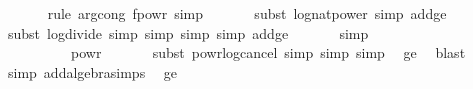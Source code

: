 \begin{isabellebody}
\ \ \ \ \ \isamarkupfalse%
\ {\isacharparenleft}{\kern0pt}rule\ arg{\isacharunderscore}{\kern0pt}cong{}{\isacharbrackleft}{\kern0pt}\ f{\isacharequal}{\kern0pt}{\isachardoublequoteopen}{\isacharparenleft}{\kern0pt}powr{\isacharparenright}{\kern0pt}{\isachardoublequoteclose}{\isacharbrackright}{\kern0pt}{\isacharcomma}{\kern0pt}\ simp{\isacharparenright}{\kern0pt}\isanewline
\ \ \ \ \ \isamarkupfalse%
\ {\isacharparenleft}{\kern0pt}subst\ log{\isacharunderscore}{\kern0pt}nat{\isacharunderscore}{\kern0pt}power{\isacharcomma}{\kern0pt}\ simp\ add{\isacharcolon}{\kern0pt}{\isasymdelta}{\isacharunderscore}{\kern0pt}ge{\isacharunderscore}{\kern0pt}{}{\isacharparenright}{\kern0pt}\isanewline
\ \ \ \ \ \isamarkupfalse%
\ {\isacharparenleft}{\kern0pt}subst\ log{\isacharunderscore}{\kern0pt}divide{\isacharcomma}{\kern0pt}\ simp{\isacharcomma}{\kern0pt}\ simp{\isacharcomma}{\kern0pt}\ simp{\isacharcomma}{\kern0pt}\ simp\ add{\isacharcolon}{\kern0pt}{\isasymdelta}{\isacharunderscore}{\kern0pt}ge{\isacharunderscore}{\kern0pt}{}{\isacharparenright}{\kern0pt}\ \isanewline
\ \ \ \ \isamarkupfalse%
\ simp{\isacharplus}{\kern0pt}\isanewline
\ \ \isamarkupfalse%
\ \isamarkupfalse%
\ {\isachardoublequoteopen}{\isachardot}{\kern0pt}{\isachardot}{\kern0pt}{\isachardot}{\kern0pt}\ {\isacharequal}{\kern0pt}\ {}{}\ {\isacharasterisk}{\kern0pt}\ {}{}\ {\isacharasterisk}{\kern0pt}\ {}{}\ {\isacharasterisk}{\kern0pt}\ {}\ powr\ {\isacharparenleft}{\kern0pt}{\isacharminus}{\kern0pt}{}{}{\isacharparenright}{\kern0pt}{\isachardoublequoteclose}\isanewline
\ \ \ \ \isamarkupfalse%
\ {\isacharparenleft}{\kern0pt}subst\ powr{\isacharunderscore}{\kern0pt}log{\isacharunderscore}{\kern0pt}cancel{\isacharcomma}{\kern0pt}\ simp{\isacharcomma}{\kern0pt}\ simp{\isacharcomma}{\kern0pt}\ simp{\isacharparenright}{\kern0pt}\ \isamarkupfalse%
\ {\isasymdelta}{\isacharunderscore}{\kern0pt}ge{\isacharunderscore}{\kern0pt}{}\ \isamarkupfalse%
\ blast\isanewline
\ \ \ \ \isamarkupfalse%
\ {\isacharparenleft}{\kern0pt}simp\ add{\isacharcolon}{\kern0pt}algebra{\isacharunderscore}{\kern0pt}simps{\isacharparenright}{\kern0pt}\ \isamarkupfalse%
\ {\isasymdelta}{\isacharunderscore}{\kern0pt}ge{\isacharunderscore}{\kern0pt}{}\ \isamarkupfalse%

\end{isabellebody}
